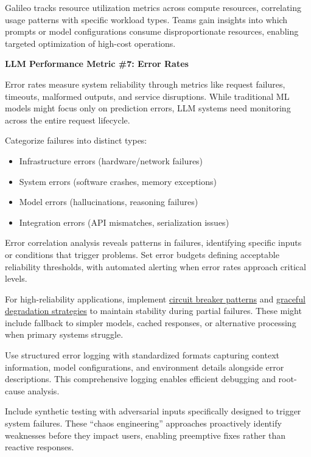 \documentclass[
  letterpaper,
  DIV=11,
  numbers=noendperiod,
  oneside]{scrreprt}
\begin{document}
\begin{tcolorbox}
Galileo tracks resource utilization metrics across compute resources,
correlating usage patterns with specific workload types. Teams gain
insights into which prompts or model configurations consume
disproportionate resources, enabling targeted optimization of high-cost
operations.

\textbf{LLM Performance Metric \#7: Error Rates}

Error rates measure system reliability through metrics like request
failures, timeouts, malformed outputs, and service disruptions. While
traditional ML models might focus only on prediction errors, LLM systems
need monitoring across the entire request lifecycle.

Categorize failures into distinct types:

\begin{itemize}
\item
  Infrastructure errors (hardware/network failures)
\item
  System errors (software crashes, memory exceptions)
\item
  Model errors (hallucinations, reasoning failures)
\item
  Integration errors (API mismatches, serialization issues)
\end{itemize}

Error correlation analysis reveals patterns in failures, identifying
specific inputs or conditions that trigger problems. Set error budgets
defining acceptable reliability thresholds, with automated alerting when
error rates approach critical levels.

For high-reliability applications, implement
\href{https://arxiv.org/pdf/2406.04313}{circuit breaker patterns} and
\href{https://medium.com/@mbneto/graceful-degradation-why-it-is-important-and-how-to-achieve-it-07f6d4a5f7d5}{graceful
degradation strategies} to maintain stability during partial failures.
These might include fallback to simpler models, cached responses, or
alternative processing when primary systems struggle.

Use structured error logging with standardized formats capturing context
information, model configurations, and environment details alongside
error descriptions. This comprehensive logging enables efficient
debugging and root-cause analysis.

Include synthetic testing with adversarial inputs specifically designed
to trigger system failures. These ``chaos engineering'' approaches
proactively identify weaknesses before they impact users, enabling
preemptive fixes rather than reactive responses.


\end{tcolorbox}
\end{document}
